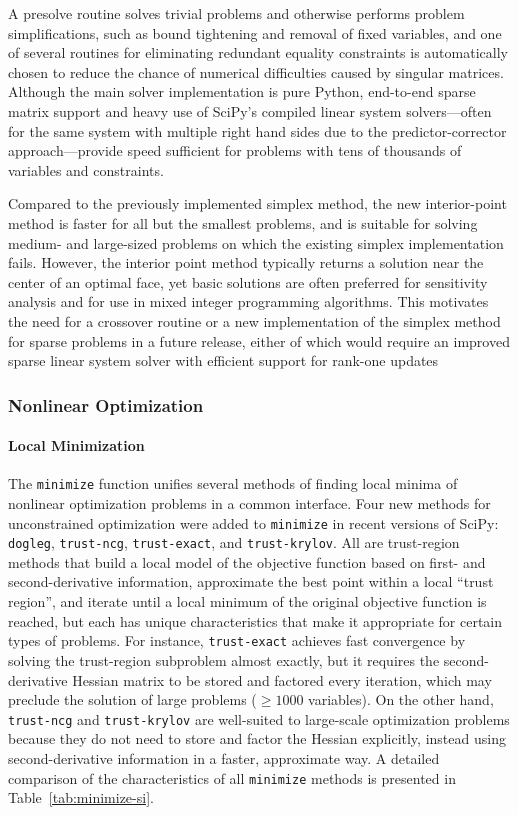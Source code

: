 A presolve routine \cite{andersen1995presolving} solves trivial problems and otherwise performs problem simplifications, such as bound tightening and removal of fixed variables, and one of several routines for eliminating redundant equality constraints is automatically chosen to reduce the chance of numerical difficulties caused by singular matrices. Although the main solver implementation is pure Python, end-to-end sparse matrix support and heavy use of SciPy's compiled linear system solvers---often for the same system with multiple right hand sides due to the predictor-corrector approach---provide speed sufficient for problems with tens of thousands of variables and constraints.

Compared to the previously implemented simplex method, the new interior-point method is faster for all but the smallest problems, and is suitable for solving medium- and large-sized problems on which the existing simplex implementation fails. However, the interior point method typically returns a solution near the center of an optimal face, yet basic solutions are often preferred for sensitivity analysis and for use in mixed integer programming algorithms. This motivates the need for a crossover routine or a new implementation of the simplex method for sparse problems in a future release, either of which would require an improved sparse linear system solver with efficient support for rank-one updates

\subsubsection*{Nonlinear Optimization}
\paragraph{Local Minimization}

The \texttt{minimize} function unifies several methods of finding local minima of nonlinear optimization problems in a common interface. Four new methods for unconstrained optimization were added to \texttt{minimize} in recent versions of SciPy: \texttt{dogleg}, \texttt{trust-ncg}, \texttt{trust-exact}, and \texttt{trust-krylov}. All are trust-region methods that build a local model of the objective function based on first- and second-derivative information, approximate the best point within a local ``trust region'', and iterate until a local minimum of the original objective function is reached, but each has unique characteristics that make it appropriate for certain types of problems. For instance, \texttt{trust-exact} achieves fast convergence by solving the trust-region subproblem almost exactly, but it requires the second-derivative Hessian matrix to be stored and factored every iteration, which may preclude the solution of large problems ($\geq 1000$ variables). On the other hand, \texttt{trust-ncg} and \texttt{trust-krylov} are well-suited to large-scale optimization problems because they do not need to store and factor the Hessian explicitly, instead using second-derivative information in a faster, approximate way. A detailed comparison of the characteristics of all \texttt{minimize} methods is presented in Table~\ref{tab:minimize-si}.



